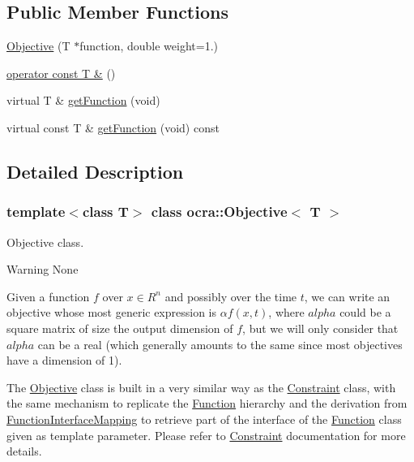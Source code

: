 \subsection*{Public Member Functions}
\begin{DoxyCompactItemize}
\item 
\hyperlink{classocra_1_1Objective_a8ece61f7359bcc67cc5a10fde1ddd11d}{Objective} (T $\ast$function, double weight=1.)
\item 
\hyperlink{classocra_1_1Objective_adde3288cc5ad20394a3558c9b8092b71}{operator const T \&} ()
\end{DoxyCompactItemize}
{\bf }\par
\begin{DoxyCompactItemize}
\item 
virtual T \& \hyperlink{classocra_1_1Objective_acefbb478e0d9ae080ead812eea70e22e}{get\+Function} (void)
\item 
virtual const T \& \hyperlink{classocra_1_1Objective_a724137e4282c67586ce8b51a5b57845e}{get\+Function} (void) const
\end{DoxyCompactItemize}



\subsection{Detailed Description}
\subsubsection*{template$<$class T$>$\newline
class ocra\+::\+Objective$<$ T $>$}

Objective class. 

\begin{DoxyWarning}{Warning}
None
\end{DoxyWarning}
Given a function $ f $ over $ x \in R^n $ and possibly over the time $ t $, we can write an objective whose most generic expression is $ \alpha f(x,t) $, where $ alpha $ could be a square matrix of size the output dimension of $ f $, but we will only consider that $ alpha $ can be a real (which generally amounts to the same since most objectives have a dimension of 1).

The \hyperlink{classocra_1_1Objective}{Objective} class is built in a very similar way as the \hyperlink{classocra_1_1Constraint}{Constraint} class, with the same mechanism to replicate the \hyperlink{classocra_1_1Function}{Function} hierarchy and the derivation from \hyperlink{structocra_1_1FunctionInterfaceMapping}{Function\+Interface\+Mapping} to retrieve part of the interface of the \hyperlink{classocra_1_1Function}{Function} class given as template parameter. Please refer to \hyperlink{classocra_1_1Constraint}{Constraint} documentation for more details.

